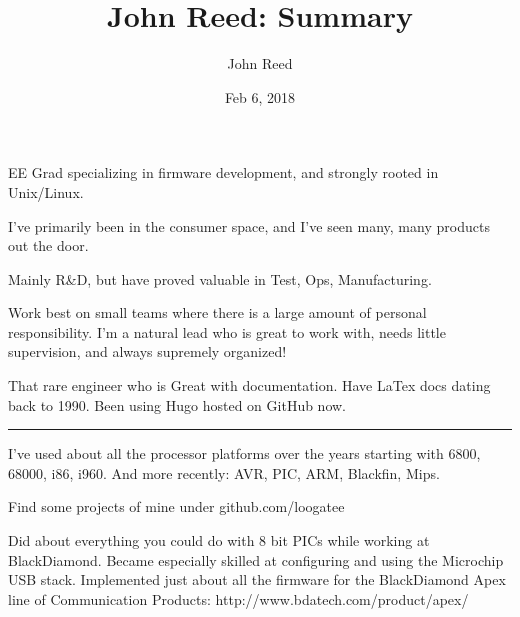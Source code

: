 \documentclass[12pt]{extarticle}
\title  { John Reed: Summary }
\author { John Reed          }
\date   { Feb 6, 2018      }
\begin{document}
\vspace{3mm}\noindent\parbox{.3in}{\hspace{.25in}}\parbox{6.0in}
{
EE Grad specializing in firmware development, and strongly rooted in Unix/Linux.
}


\vspace{3mm}\noindent\parbox{.3in}{\hspace{.25in}}\parbox{6.0in}
{
I've primarily been in the consumer space, and I've seen many, many products out the door.
}

\vspace{3mm}\noindent\parbox{.3in}{\hspace{.25in}}\parbox{6.0in}
{
Mainly R\&D, but have proved valuable in Test, Ops, Manufacturing.
}

\vspace{3mm}\noindent\parbox{.3in}{\hspace{.25in}}\parbox{6.0in}
{
Work best on small teams where there is a large amount of personal responsibility.  I'm a natural lead who is great to work with, needs little supervision, and always supremely organized!
}

\vspace{3mm}\noindent\parbox{.3in}{\hspace{.25in}}\parbox{6.0in}
{
That rare engineer who is Great with documentation.   Have LaTex docs dating back to 1990.  Been using Hugo hosted on GitHub now.
}


\vspace{3mm}\noindent\parbox{.3in}{\hspace{.25in}}\parbox{6.0in}
{
\rule{3.5in}{.01in}
}


\vspace{3mm}\noindent\parbox{.3in}{\hspace{.25in}}\parbox{6.0in}
{
I've used about all the processor platforms over the years starting with 6800, 68000, i86, i960.  And more recently: AVR, PIC, ARM, Blackfin, Mips.
}


\vspace{3mm}\noindent\parbox{.3in}{\hspace{.25in}}\parbox{6.0in}
{
Find some projects of mine under github.com/loogatee
}

\vspace{3mm}\noindent\parbox{.3in}{\hspace{.25in}}\parbox{6.0in}
{
Did about everything you could do with 8 bit PICs while working at BlackDiamond.  Became especially skilled at configuring and using the Microchip USB stack.  Implemented just about all the firmware for the BlackDiamond Apex line of Communication Products:  http://www.bdatech.com/product/apex/ 
}
\end{document}
